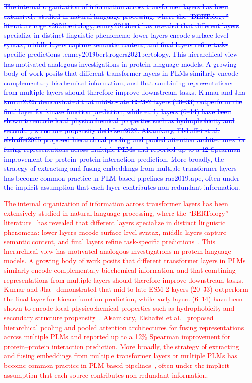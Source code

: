 \documentclass[11pt,a4paper]{article}
\newcommand{\rev}[1]{\textcolor{red}{#1}}
\begin{document}
\textcolor{blue}{\sout{The internal organization of information across transformer layers has been
extensively studied in natural language processing, where the ``BERTology''
literature rogers2021bertology,tenney2019bert has revealed that different layers specialize
in distinct linguistic phenomena: lower layers encode surface-level syntax, middle
layers capture semantic content, and final layers refine task-specific
predictions tenney2019bert,rogers2021bertology.
This hierarchical view has motivated analogous investigations in protein language
models. A growing body of work posits that different transformer layers in PLMs
similarly encode complementary biochemical information, and that combining
representations from multiple layers should therefore improve downstream tasks.
Kumar and Jha kumar2025 demonstrated that mid-to-late ESM-2 layers (20--33)
outperform the final layer for kinase function prediction, while early layers
(6--14) have been shown to encode local physicochemical properties such as
hydrophobicity and secondary structure propensity detlefsen2022.
Alsamkary, Elshaffei et al. elshaffei2025 proposed hierarchical pooling and
pooled attention architectures for fusing representations across multiple PLMs and
reported up to a 12 Spearman improvement for protein--protein interaction
prediction. More broadly, the strategy of extracting and fusing embeddings from
multiple transformer layers has become common practice in PLM-based
pipelines rao2019tape, often under the implicit assumption that each layer
contributes non-redundant information.}}

\textcolor{red}{The internal organization of information across transformer layers has been
extensively studied in natural language processing, where the ``BERTology''
literature~\cite{rogers2021bertology,tenney2019bert} has revealed that different layers specialize
in distinct linguistic phenomena: lower layers encode surface-level syntax, middle
layers capture semantic content, and final layers refine task-specific
predictions~\rev{\cite{tenney2019bert,rogers2021bertology}}.
This hierarchical view has motivated analogous investigations in protein language
models. A growing body of work posits that different transformer layers in PLMs
similarly encode complementary biochemical information, and that combining
representations from multiple layers should therefore improve downstream tasks.
Kumar and Jha~\cite{kumar2025} demonstrated that mid-to-late ESM-2 layers (20--33)
outperform the final layer for kinase function prediction, while early layers
(6--14) have been shown to encode local physicochemical properties such as
hydrophobicity and secondary structure propensity~\cite{detlefsen2022}.
Alsamkary, Elshaffei et al.~\cite{elshaffei2025} proposed hierarchical pooling and
pooled attention architectures for fusing representations across multiple PLMs and
reported up to a 12\% Spearman improvement for protein--protein interaction
prediction. More broadly, the strategy of extracting and fusing embeddings from
multiple transformer layers or multiple PLMs has become common practice in
PLM-based pipelines~\cite{rao2019tape,ko2026fusion,si2024contact}, often under
the implicit assumption that each source contributes non-redundant
information.}
\end{document}
